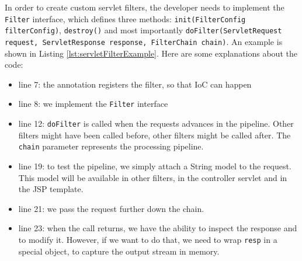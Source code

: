 In order to create custom servlet filters, the developer needs to implement the \texttt{Filter} interface, which defines three methods: \texttt{init(FilterConfig filterConfig)}, \texttt{destroy()} and most importantly \texttt{doFilter(ServletRequest request, ServletResponse response, FilterChain chain)}. An example is shown in Listing \ref{lst:servletFilterExample}. Here are some explanations about the code:

\begin{itemize}
\item line 7: the annotation registers the filter, so that \ac{IoC} can happen
\item line 8: we implement the \texttt{Filter} interface
\item line 12: \texttt{doFilter} is called when the requests advances in the pipeline. Other filters might have been called before, other filters might be called after. The \texttt{chain} parameter represents the processing pipeline.
\item line 19: to test the pipeline, we simply attach a String model to the request. This model will be available in other filters, in the controller servlet and in the \ac{JSP} template.
\item line 21: we pass the request further down the chain.
\item line 23: when the call returns, we have the ability to inspect the response and to modify it. However, if we want to do that, we need to wrap \texttt{resp} in a special object, to capture the output stream in memory.
\end{itemize}

